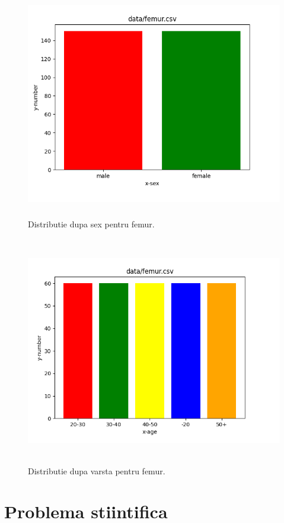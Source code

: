 \documentclass[runningheads,a4paper,11pt]{report}
\begin{document}
\begin{figure}[h!]
\centerline{\includegraphics[height=10cm]{Imagini/plot_femur_sex.png}}
\caption{Distributie dupa sex pentru femur.}
\label{fig}
\end{figure}

\begin{figure}[h!]
\centerline{\includegraphics[height=10cm]{Imagini/plot_femur_age.png}}
\caption{Distributie dupa varsta pentru femur.}
\label{fig}
\end{figure}

\chapter{Problema stiintifica}
\label{section:problemaStiintifica}
\end{document}
